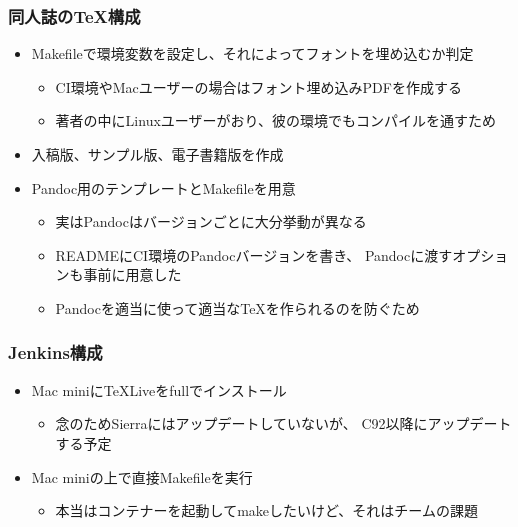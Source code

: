 \begin{frame}
  \frametitle{同人誌の\TeX 構成}

  \begin{itemize}
    \item<2-> Makefileで環境変数を設定し、それによってフォントを埋め込むか判定
    \begin{itemize}
      \item CI環境やMacユーザーの場合はフォント埋め込みPDFを作成する
      \item 著者の中にLinuxユーザーがおり、彼の環境でもコンパイルを通すため
    \end{itemize}

    \item<3-> 入稿版、サンプル版、電子書籍版を作成

    \item<4-> Pandoc用のテンプレートとMakefileを用意
    \begin{itemize}
      \item 実はPandocはバージョンごとに大分挙動が異なる
      \item READMEにCI環境のPandocバージョンを書き、
      Pandocに渡すオプションも事前に用意した
      \item Pandocを適当に使って適当な\TeX を作られるのを防ぐため
    \end{itemize}
  \end{itemize}
\end{frame}

\begin{frame}
  \frametitle{Jenkins構成}

  \begin{itemize}
    \item<1-> Mac miniに\TeX Liveをfullでインストール
    \begin{itemize}
      \item 念のためSierraにはアップデートしていないが、
      C92以降にアップデートする予定
    \end{itemize}
    
    \item<2-> Mac miniの上で直接Makefileを実行
    \begin{itemize}
      \item 本当はコンテナーを起動してmakeしたいけど、それはチームの課題
    \end{itemize}
  \end{itemize}
\end{frame}

